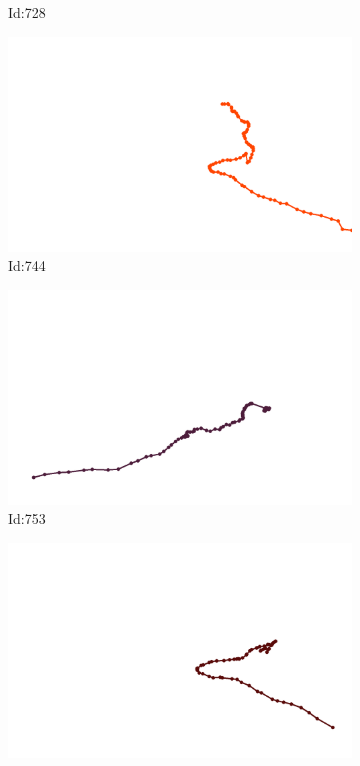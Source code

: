 \documentclass[12pt,twoside]{report}
\begin{document}
\begin{figure}
\begin{subfigure}[b]{0.20\textwidth}
\caption{Id:728}
\end{subfigure}
\begin{subfigure}[b]{0.20\textwidth}
\centering
\includegraphics[width=\textwidth]{../trajectories/744.png}
\caption{Id:744}
\end{subfigure}
\begin{subfigure}[b]{0.20\textwidth}
\centering
\includegraphics[width=\textwidth]{../trajectories/753.png}
\caption{Id:753}
\end{subfigure}
\begin{subfigure}[b]{0.20\textwidth}
\centering
\includegraphics[width=\textwidth]{../trajectories/757.png}

\end{subfigure}
\end{figure}
\end{document}
